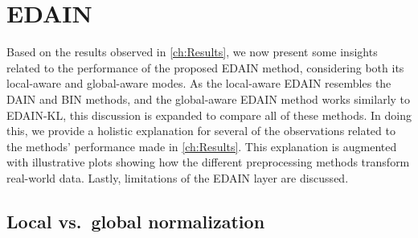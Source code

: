 \documentclass{statsmsc}
\begin{document}
{%
\section{EDAIN}%
\label{sec:EDAIN-discuss}

Based on the results observed in \cref{ch:Results},
we now present some insights related to the performance of the proposed
\ac{EDAIN} method, considering both its local-aware and global-aware modes.
As the local-aware \ac{EDAIN} resembles the
\ac{DAIN} and \ac{BIN} methods, and the global-aware \ac{EDAIN} method works similarly
to \ac{EDAIN-KL}, this discussion is expanded to compare all of these methods. In doing this,
we provide a holistic explanation for several of the observations related to
the methods' performance made in \cref{ch:Results}.
This explanation is augmented  with illustrative plots showing how the different preprocessing
methods transform real-world data.
Lastly, limitations of the \ac{EDAIN} layer are discussed.

\subsection{Local vs.\ global normalization}%
\label{sub:local_vs_global}

}
\end{document}
